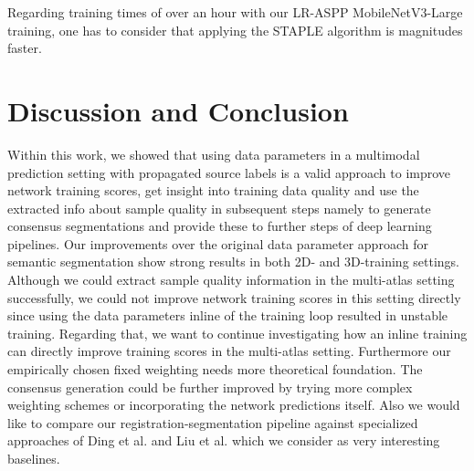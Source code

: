     Regarding training times of over an hour with our LR-ASPP MobileNetV3-Large training, one has to consider that applying the STAPLE algorithm is magnitudes faster.

\section{Discussion and Conclusion}
    \label{sec:conclusion}
    Within this work, we showed that using data parameters in a multimodal prediction setting with propagated source labels is a valid approach to improve network training scores, get insight into training data quality and use the extracted info about sample quality in subsequent steps namely to generate consensus segmentations and provide these to further steps of deep learning pipelines. Our improvements over the original data parameter approach for semantic segmentation show strong results in both 2D- and 3D-training settings. Although we could extract sample quality information in the multi-atlas setting successfully, we could not improve network training scores in this setting directly since using the data parameters inline of the training loop resulted in unstable training.
    Regarding that, we want to continue investigating how an inline training can directly improve training scores in the multi-atlas setting. Furthermore our empirically chosen fixed weighting needs more theoretical foundation. The consensus generation could be further improved by trying more complex weighting schemes or incorporating the network predictions itself. Also we would like to compare our registration-segmentation pipeline against specialized approaches of Ding et al. and Liu et al. \citep{ding2019votenet,ding2020votenet+,liu2021style} which we consider as very interesting baselines.
